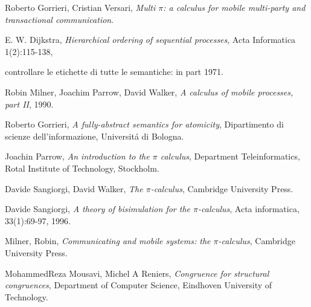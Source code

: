\begin{thebibliography}{99}

  Roberto Gorrieri, Cristian Versari,
  \emph{Multi $\pi$: a calculus for mobile multi-party and transactional communication}.

  E. W. Dijkstra,
  \emph{Hierarchical ordering of sequential processes},
  Acta Informatica 1(2):115-138,   \item	
    controllare le etichette di tutte le semantiche: in part
  1971.

  Robin Milner, Joachim Parrow, David Walker,
  \emph{A calculus of mobile processes, part II},
  1990.


  Roberto Gorrieri,
  \emph{A fully-abstract semantics for atomicity},
  Dipartimento di scienze dell'informazione, 
  Universit\'a di Bologna.


  Joachin Parrow, 
  \emph{An introduction to the $\pi$ calculus},
  Department Teleinformatics,
  Rotal Institute of Technology,
  Stockholm.


  Davide Sangiorgi, David Walker,
  \emph{The $\pi$-calculus},
  Cambridge University Press.

  Davide Sangiorgi,
  \emph{A theory of bisimulation for the $\pi$-calculus},
  Acta informatica, 33(1):69-97, 1996.



  Milner, Robin, 
  \emph{Communicating and mobile systems: the $\pi$-calculus},
  Cambridge University Press.

  MohammedReza Mousavi, Michel A Reniers,
  \emph{Congruence for structural congruences},
  Department of Computer Science,
  Eindhoven University of Technology.



\end{thebibliography}
